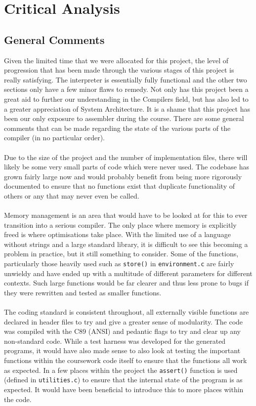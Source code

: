 \chapter{Critical Analysis}

\section{General Comments}
Given the limited time that we were allocated for this project, the level of progression that has been made through the various stages of this project is really satisfying. The interpreter is essentially fully functional and the other two sections only have a few minor flaws to remedy. Not only has this project been a great aid to further our understanding in the Compilers field, but has also led to a greater appreciation of System Architecture. It is a shame that this project has been our only exposure to assembler during the course. There are some general comments that can be made regarding the state of the various parts of the compiler (in no particular order). 
\ \\ \ \\
Due to the size of the project and the number of implementation files, there will likely be some very small parts of code which were never used. The codebase has grown fairly large now and would probably benefit from being more rigorously documented to ensure that no functions exist that duplicate functionality of others or any that may never even be called.
\ \\ \ \\
Memory management is an area that would have to be looked at for this to ever transition into a serious compiler. The only place where memory is explicitly freed is where optimisations take place. With the limited use of a language without strings and a large standard library, it is difficult to see this becoming a problem in practice, but it still something to consider. Some of the functions, particularly those heavily used such as \verb!store()! in \verb!environment.c! are fairly unwieldy and have ended up with a multitude of different parameters for different contexts. Such large functions would be far clearer and thus less prone to bugs if they were rewritten and tested as smaller functions.
\ \\ \ \\
The coding standard is consistent throughout, all externally visible functions are declared in header files to try and give a greater sense of modularity. The code was compiled with the C89 (ANSI) and pedantic flags to try and clear up any non-standard code. While a test harness was developed for the generated programs, it would have also made sense to also look at testing the important functions within the coursework code itself to ensure that the functions all work as expected. In a few places within the project the \verb!assert()! function is used (defined in \verb!utilities.c!) to ensure that the internal state of the program is as expected. It would have been beneficial to introduce this to more places within the code.
